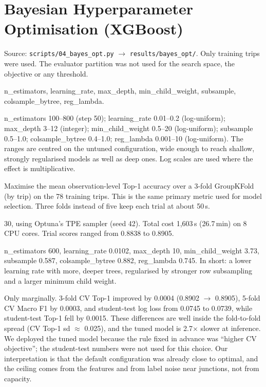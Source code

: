 \documentclass[10pt,a4paper]{article}
\newcommand{\code}[1]{\texttt{\small #1}}
\newcommand{\note}[1]{{\noindent\small\color{black!65}#1\par}}
\newenvironment{qa}{\begin{description}[leftmargin=0pt,labelsep=0.4em,itemsep=2pt,font=\bfseries\color{accent!80!black}]}{\end{description}}
\begin{document}
\section{Bayesian Hyperparameter Optimisation (XGBoost)}\label{sec:bayes}
\note{Source: \code{scripts/04\_bayes\_opt.py} $\rightarrow$ \code{results/bayes\_opt/}. Only training trips were used. The evaluator partition was not used for the search space, the objective or any threshold.}
\begin{qa}
\item[1. Hyperparameters searched.] n\_estimators, learning\_rate, max\_depth, min\_child\_weight, subsample, colsample\_bytree, reg\_lambda.
\item[2. Ranges / distributions.] n\_estimators 100--800 (step 50); learning\_rate 0.01--0.2 (log-uniform); max\_depth 3--12 (integer); min\_child\_weight 0.5--20 (log-uniform); subsample 0.5--1.0; colsample\_bytree 0.4--1.0; reg\_lambda 0.001--10 (log-uniform). The ranges are centred on the untuned configuration, wide enough to reach shallow, strongly regularised models as well as deep ones. Log scales are used where the effect is multiplicative.
\item[3. Objective.] Maximise the mean observation-level Top-1 accuracy over a 3-fold GroupKFold (by trip) on the 78 training trips. This is the same primary metric used for model selection. Three folds instead of five keep each trial at about 50\,s.
\item[4. Trials.] 30, using Optuna's TPE sampler (seed 42). Total cost 1{,}603\,s (26.7\,min) on 8 CPU cores. Trial scores ranged from 0.8838 to 0.8905.
\item[5. Best values.] n\_estimators 600, learning\_rate 0.0102, max\_depth 10, min\_child\_weight 3.73, subsample 0.587, colsample\_bytree 0.882, reg\_lambda 0.745. In short: a lower learning rate with more, deeper trees, regularised by stronger row subsampling and a larger minimum child weight.
\item[6. Did tuning help?] Only marginally. 3-fold CV Top-1 improved by 0.0004 (0.8902 $\rightarrow$ 0.8905), 5-fold CV Macro F1 by 0.0003, and student-test log loss from 0.0745 to 0.0739, while student-test Top-1 fell by 0.0015. These differences are well inside the fold-to-fold spread (CV Top-1 sd $\approx$ 0.025), and the tuned model is 2.7$\times$ slower at inference. We deployed the tuned model because the rule fixed in advance was ``higher CV objective''; the student-test numbers were not used for this choice. Our interpretation is that the default configuration was already close to optimal, and the ceiling comes from the features and from label noise near junctions, not from capacity.
\end{qa}
\end{document}
